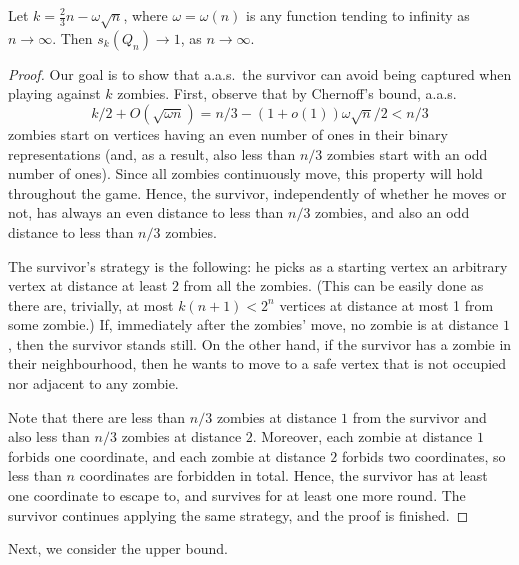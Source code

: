 \documentclass[12pt]{amsart}
\begin{document}
\begin{lemma}\label{lemm1}
Let $k = \frac 23 n -  \omega \sqrt{n}$, where $\omega = \omega(n)$ is any function tending to infinity as $n\to \infty$. Then $s_k(Q_n) \to 1$, as $n \to \infty$.
\end{lemma}
\begin{proof}
Our goal is to show that a.a.s.\ the survivor can avoid being captured when playing against $k$ zombies. First, observe that by Chernoff's bound, a.a.s.\
$$
k/2 + O(\sqrt{\omega n}) = n/3 - (1+o(1)) \omega \sqrt{n} / 2 < n/3
$$
zombies start on vertices having an even number of ones in their binary representations (and, as a result, also less than $n/3$ zombies start with an odd number of ones). Since all zombies
continuously move, this property will hold throughout the game. Hence, the survivor, independently of whether he moves or not, has always an even distance to less than $n/3$ zombies, and also an odd
distance to less than $n/3$ zombies.

The survivor's strategy is the following: he picks as a starting vertex an arbitrary vertex at distance at least $2$ from all the zombies. (This can be easily done as there are, trivially, at most
$k (n+1) < 2^n$ vertices at distance at most 1 from some zombie.) If, immediately after the zombies' move, no zombie is at distance $1$, then the survivor stands still. On the other hand, if the
survivor has a zombie in their neighbourhood, then he wants to move to a safe vertex that is not occupied nor adjacent to any zombie.

Note that there are less than $n/3$ zombies at distance $1$ from the survivor and also less than $n/3$ zombies at distance $2$. Moreover, each zombie at distance $1$ forbids one coordinate, and each zombie at distance $2$ forbids two coordinates, so less than $n$ coordinates are forbidden in total. Hence, the survivor has at
least one coordinate to escape to, and survives for at least one more round. The survivor continues applying the same strategy, and the proof is finished.
\end{proof}

Next, we consider the upper bound.
\end{document}
